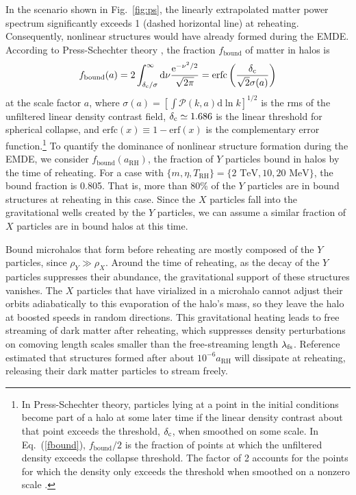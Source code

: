 \documentclass[a4paper,11pt]{article}
\newcommand{\rh}[1]{{#1}_{\mathrm{RH}}}
\newcommand{\lfs}{\lambda_{\rm fs}}
\newcommand{\dc}{\delta_{\rm c}}
\newcommand{\diff}{\ensuremath{\mathrm{d}}}
\newcommand{\e}{\mathrm{e}}
\begin{document}
In the scenario shown in Fig.~\ref{fig:ps}, the linearly extrapolated matter power spectrum significantly exceeds 1 (dashed horizontal line) at reheating. Consequently, nonlinear structures would have already formed during the EMDE.
According to Press-Schechter theory \cite{press-schechter}, the fraction $f_\mathrm{bound}$ of matter in halos is
\begin{equation}\label{fbound}
    f_\mathrm{bound}(a) = 2\int_{\dc/\sigma}^\infty \diff\nu \frac{\e^{-\nu^2/2}}{\sqrt{2\pi}}
    =\mathrm{erfc}\left(\frac{\dc}{\sqrt{2}\sigma(a)}\right)
\end{equation}
at the scale factor $a$, where $\sigma(a) = [\int \mathcal{P}(k,a)\diff \ln k]^{1/2}$ is the rms of the unfiltered linear density contrast field, $\dc\simeq 1.686$ is the linear threshold for spherical collapse, and $\mathrm{erfc}(x)\equiv 1-\mathrm{erf}(x)$ is the complementary error function.\footnote{In Press-Schechter theory, particles lying at a point in the initial conditions become part of a halo at some later time if the linear density contrast about that point exceeds the threshold, $\dc$, when smoothed on some scale. In Eq.~(\ref{fbound}), $f_\mathrm{bound}/2$ is the fraction of points at which the unfiltered density exceeds the collapse threshold. The factor of 2 accounts for the points for which the density only exceeds the threshold when smoothed on a nonzero scale \cite{1991ApJ...379..440B}.}
To quantify the dominance of nonlinear structure formation during the EMDE, we consider $f_\mathrm{bound}(\rh{a})$, the fraction of $Y$ particles bound in halos by the time of reheating. For a case with $\{m,\eta,\rh{T}\} = \{2 \text{ TeV},10, {20} \text{ MeV} \}$, the bound fraction is 0.805. That is, more than 80\% of the $Y$ particles are in bound structures at reheating in this case. Since the $X$ particles fall into the gravitational wells created by the $Y$ particles, we can assume a similar fraction of $X$ particles are in bound halos at this time.

Bound microhalos that form before reheating are mostly composed of the $Y$ particles, since $\rho_Y \gg \rho_X$. Around the time of reheating, as the decay of the $Y$ particles suppresses their abundance, the gravitational support of these structures vanishes. The $X$ particles that have virialized in a microhalo cannot adjust their orbits adiabatically to this evaporation of the halo's mass, so they leave the halo at boosted speeds in random directions. This gravitational heating leads to free streaming of dark matter after reheating, which suppresses density perturbations on comoving length scales smaller than the free-streaming length $\lfs$. Reference \cite{blanco19} estimated that structures formed after about $10^{-6} \rh{a}$ will dissipate at reheating, releasing their dark matter particles to stream freely. 
\end{document}
